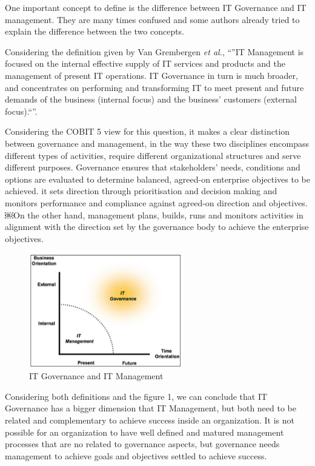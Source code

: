 One important concept to define is the difference between IT Governance and IT management. They are many times confused and some authors already tried to explain the difference between the two concepts.\par
Considering the definition given by Van Grembergen \textit{et al.}, ``''IT Management is focused on the internal effective supply of IT services and products and the management of present IT operations. IT Governance in turn is much broader, and concentrates on performing and transforming IT to meet present and future demands of the business (internal focus) and the business' customers (external focus).``''.\par
 Considering the COBIT 5 view for this question, it makes a clear distinction between governance and management, in the way these two disciplines encompass different types of activities, require different organizational structures and serve different purposes. Governance ensures that stakeholders' needs, conditions and options are evaluated to determine balanced, agreed-on enterprise objectives to be achieved. it sets direction through prioritisation and decision making and monitors performance and compliance against agreed-on direction and objectives.￼On the other hand, management plans, builds, runs and monitors activities in alignment with the direction set by the governance body to achieve the enterprise objectives.\par

\begin{figure}
\centering
\includegraphics[width=0.6\textwidth]{img/ITGovernanceAndManagement.png}
\caption{IT Governance and IT Management}
\end{figure}


 Considering both definitions and the figure 1, we can conclude that IT Governance has a bigger dimension that IT Management, but both need to be related and complementary to achieve success inside an organization. It is not possible for an organization to have well defined and matured management processes that are no related to governance aspects, but governance needs management to achieve goals and objectives settled to achieve success.


